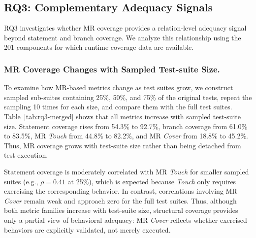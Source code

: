 \subsection{RQ3: Complementary Adequacy Signals}\label{sec:rq3-results}
RQ3 investigates whether MR coverage provides a relation-level adequacy signal beyond statement and branch coverage. We analyze this relationship using the 201 components for which runtime coverage data are available.

\subsubsection{MR Coverage Changes with Sampled Test-suite Size.}
To examine how MR-based metrics change as test suites grow, we construct sampled sub-suites containing 25\%, 50\%, and 75\% of the original tests, repeat the sampling 10 times for each size, and compare them with the full test suites. Table~\ref{tab:rq3-merged} shows that all metrics increase with sampled test-suite size. Statement coverage rises from 54.3\% to 92.7\%, branch coverage from 61.0\% to 83.5\%, MR \textit{Touch} from 44.8\% to 82.2\%, and MR \textit{Cover} from 18.8\% to 45.2\%. Thus, MR coverage grows with test-suite size rather than being detached from test execution.

Statement coverage is moderately correlated with MR \textit{Touch} for smaller sampled suites (e.g., $\rho=0.41$ at 25\%), which is expected because \textit{Touch} only requires exercising the corresponding behavior. In contrast, correlations involving MR \textit{Cover} remain weak and approach zero for the full test suites. Thus, although both metric families increase with test-suite size, structural coverage provides only a partial view of behavioral adequacy: MR \textit{Cover} reflects whether exercised behaviors are explicitly validated, not merely executed.


